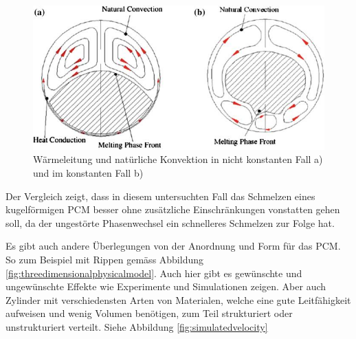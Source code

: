 \documentclass[11pt,a4paper]{scrartcl}
\begin{document}
\begin{figure}[h!]
\begin{center}
\includegraphics[scale=0.6]{images/heatconductionin.jpg}
\caption{Wärmeleitung und natürliche Konvektion in nicht konstanten Fall a) und
im konstanten Fall b) \cite{WasteEnergyHarvesting}}
\label{fig:heatconductionin}
\end{center}
\end{figure}

Der Vergleich zeigt, dass in diesem untersuchten Fall das Schmelzen eines
kugelförmigen PCM besser ohne zusätzliche Einschränkungen vonstatten
gehen soll, da der ungestörte Phasenwechsel ein schnelleres Schmelzen
zur Folge hat.

Es gibt auch andere Überlegungen von der Anordnung und Form für das PCM. So zum
Beispiel mit Rippen gemäss Abbildung \ref{fig:threedimensionalphysicalmodel}.
Auch hier gibt es gewünschte und ungewünschte Effekte wie Experimente und
Simulationen zeigen. Aber auch Zylinder mit verschiedensten Arten von
Materialen, welche eine gute Leitfähigkeit aufweisen und wenig Volumen
benötigen, zum Teil strukturiert oder unstrukturiert verteilt. Siehe
Abbildung \ref{fig:simulatedvelocity}
\end{document}
